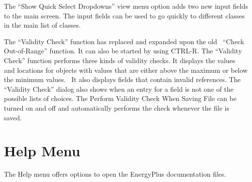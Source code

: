 The ``Show Quick Select Dropdowns'' view menu option adds two new input fields to the main screen. The input fields can be used to go quickly to different classes in the main list of classes.

The ``Validity Check'' function has replaced and expanded upon the old~ ``Check Out-of-Range'' function. It can also be started by using CTRL-R. The ``Validity Check'' function performs three kinds of validity checks. It displays the values and locations for objects with values that are either above the maximum or below the minimum values.~ It also displays fields that contain invalid references. The ``Validity Check'' dialog also shows when an entry for a field is not one of the possible lists of choices. The Perform Validity Check When Saving File can be turned on and off and automatically performs the check whenever the file is saved.

\section{Help Menu}\label{help-menu-000}

The Help menu offers options to open the EnergyPlus documentation files.
